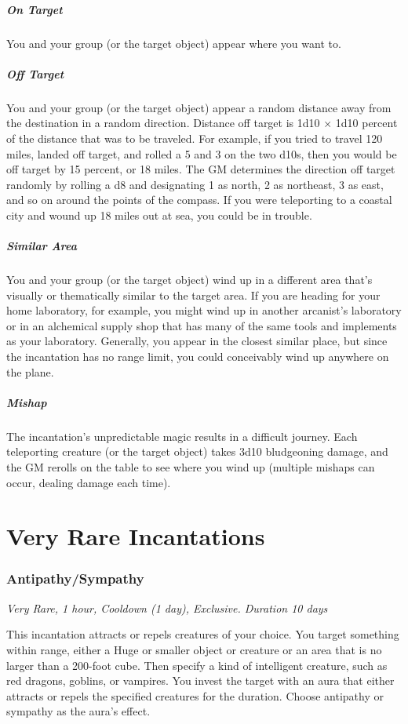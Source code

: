\subparagraph*{On Target} You and your group (or the target object) appear where you want to.

\subparagraph*{Off Target} You and your group (or the target object) appear a random distance away from the destination in a random direction. Distance off target is 1d10 × 1d10 percent of the distance that was to be traveled. For example, if you tried to travel 120 miles, landed off target, and rolled a 5 and 3 on the two d10s, then you would be off target by 15 percent, or 18 miles. The GM determines the direction off target randomly by rolling a d8 and designating 1 as north, 2 as northeast, 3 as east, and so on around the points of the compass. If you were teleporting to a coastal city and wound up 18 miles out at sea, you could be in trouble.

\subparagraph*{Similar Area} You and your group (or the target object) wind up in a different area that's visually or thematically similar to the target area. If you are heading for your home laboratory, for example, you might wind up in another arcanist's laboratory or in an alchemical supply shop that has many of the same tools and implements as your laboratory. Generally, you appear in the closest similar place, but since the incantation has no range limit, you could conceivably wind up anywhere on the plane.

\subparagraph*{Mishap} The incantation's unpredictable magic results in a difficult journey. Each teleporting creature (or the target object) takes 3d10 bludgeoning damage, and the GM rerolls on the table to see where you wind up (multiple mishaps can occur, dealing damage each time).

\section{Very Rare Incantations}

\subsubsection{Antipathy/Sympathy}
\textit{Very Rare, 1 hour, Cooldown (1 day), Exclusive. Duration 10 days}

This incantation attracts or repels creatures of your choice. You target something within range, either a Huge or smaller object or creature or an area that is no larger than a 200-foot cube. Then specify a kind of intelligent creature, such as red dragons, goblins, or vampires. You invest the target with an aura that either attracts or repels the specified creatures for the duration. Choose antipathy or sympathy as the aura's effect.

